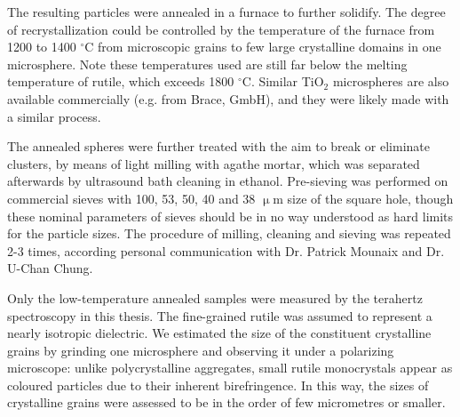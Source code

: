 The resulting particles were annealed in a furnace to further solidify. The degree of recrystallization could be controlled  by the temperature of the furnace from 1200 to 1400 $^{\circ}$C from microscopic grains to few large crystalline domains in one microsphere. Note these temperatures used are still far below the melting temperature of rutile, which exceeds 1800 $^{\circ}$C.
Similar TiO$_{2}$ microspheres are also available commercially (e.g. from Brace, GmbH), and they were likely made with a similar process.

The annealed spheres were further treated with the aim to break or eliminate clusters, by means of light milling with agathe mortar, which was separated afterwards by ultrasound bath cleaning in ethanol. Pre-sieving was performed on commercial sieves with 100, 53, 50, 40 and 38 $\upmu$m size of the square hole, though these nominal parameters of sieves should be in no way understood as hard limits for the particle sizes. The procedure of milling, cleaning and sieving was repeated 2-3 times, according personal communication with Dr. Patrick Mounaix and {Dr.} U-Chan Chung.

Only the low-temperature annealed samples were measured by the terahertz spectroscopy in this thesis. The fine-grained rutile was assumed to represent a nearly isotropic dielectric. We estimated the size of the constituent crystalline grains by grinding one microsphere and observing it under a polarizing microscope: unlike polycrystalline aggregates, small rutile monocrystals appear as coloured particles due to their inherent birefringence. In this way, the sizes of crystalline grains were assessed to be in the order of few micrometres or smaller.



